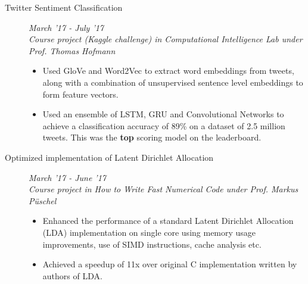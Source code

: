 \documentclass[9pt]{article}
\newenvironment{changemargin}[2]{%
  \begin{list}{}{%
      \setlength{\topsep}{0pt}%
    \setlength{\leftmargin}{#1}%
    \setlength{\rightmargin}{#2}%
    \setlength{\listparindent}{\parindent}%
  \setlength{\itemindent}{\parindent}%
    \setlength{\parsep}{\parskip}%
    }%
  \item[]}{\end{list}
    }
\newenvironment{body} {
  \vspace*{-16pt}
        \begin{changemargin}{-0.6in}{-0.65in}
        }	
        {\end{changemargin}
}
\begin{document}
\begin{body}
\begin{description}
    \item[\normalsize{Twitter Sentiment Classification}] \hfill \textit{March '17 - July '17} \\
      \textit{Course project (Kaggle challenge) in Computational Intelligence Lab
      under Prof. Thomas Hofmann}
      \begin{itemize}
        \item Used GloVe and Word2Vec to extract word embeddings from tweets, 
          along with a combination of unsupervised sentence level embeddings to
          form feature vectors.
        \item Used an ensemble of LSTM, GRU and Convolutional Networks
          to achieve a classification accuracy of 89\% on a dataset of 2.5 million
          tweets. This was the {\bf top} scoring model on the leaderboard. 
      \end{itemize}

    \item[\normalsize{Optimized implementation of Latent Dirichlet Allocation}]  \hfill \textit{March '17 - June '17} \\
      \textit{Course project in How to Write Fast Numerical Code under Prof. Markus P{\"u}schel}
      \begin{itemize}
        \item Enhanced the performance of a standard Latent Dirichlet Allocation (LDA)
          implementation on single core using memory usage improvements, use of 
          SIMD instructions, cache analysis etc.
        \item Achieved a speedup of 11x over original C implementation written by authors
          of LDA.
      \end{itemize}



\end{description}
\end{body}
\end{document}
